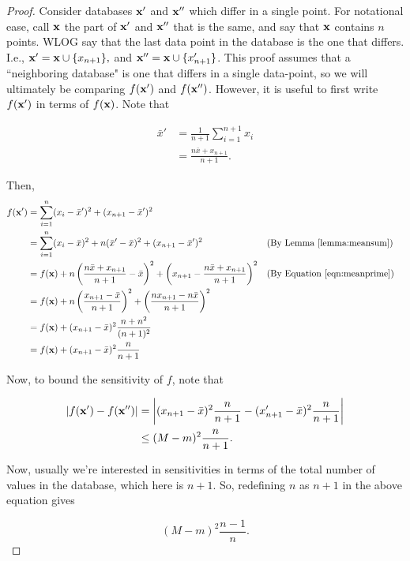 \documentclass[11pt]{scrartcl} %
\begin{document}
\begin{proof}
Consider databases $\textbf{x}'$ and $\textbf{x}''$ which differ in a single point. For notational ease, call $\textbf{x}$ the part of $\textbf{x}'$ and $\textbf{x}''$
that is the same, and say that $\textbf{x}$ contains $n$ points. WLOG say that the last data point in the database is the one that differs. I.e.,  
$\textbf{x}' = \textbf{x} \cup \{x_{n+1}\},$ and $\textbf{x}'' = \textbf{x} \cup \{x'_{n+1}\}$. This proof assumes that a ``neighboring database" is one that differs in a single
data-point, so we will ultimately be comparing $f(\textbf{x}')$ and $f(\textbf{x}'')$. However, it is useful to first write $f(\textbf{x}')$ in terms of $f(\textbf{x})$.
Note that

\begin{align}
\label{eqn:meanprime}
\bar{x}' &= \frac{1}{n+1} \sum_{i=1}^{n+1} x_i \nonumber \\
	&= \frac{n\bar{x} + x_{n+1}}{n+1}.
\end{align}

Then,
\begin{align*}
f(\textbf{x}') &= \sum_{i=1}^n (x_i - \bar{x}')^2 + (x_{n+1} - \bar{x}')^2\\
	&= \sum_{i=1}^n (x_i - \bar{x})^2 + n(\bar{x}'-\bar{x})^2 + (x_{n+1} - \bar{x}')^2 &&\text{(By Lemma \ref{lemma:meansum})}\\
	&= f(\textbf{x}) + n\left( \frac{n\bar{x} + x_{n+1}}{n+1}-\bar{x}\right)^2 + \left(x_{n+1} - \frac{n\bar{x} + x_{n+1}}{n+1} \right)^2 &&\text{(By Equation \ref{eqn:meanprime})}\\
	&= f(\textbf{x}) + n\left(\frac{x_{n+1}-\bar{x}}{n+1}\right)^2 + \left( \frac{nx_{n+1}-n\bar{x}}{n+1}\right)^2\\
	&= f(\textbf{x}) + (x_{n+1}-\bar{x})^2 \frac{n+n^2}{(n+1)^2}\\
	&= f(\textbf{x}) + (x_{n+1}-\bar{x})^2 \frac{n}{n+1}\\
\end{align*}

Now, to bound the sensitivity of $f$, note that

\begin{align*}
\left\vert f(\textbf{x}') - f(\textbf{x}'') \right\vert &= \left\vert (x_{n+1}-\bar{x})^2 \frac{n}{n+1} - (x_{n+1}'-\bar{x})^2 \frac{n}{n+1} \right\vert\\
	&\le (M-m)^2 \frac{n}{n+1}.
\end{align*}

Now, usually we're interested in sensitivities in terms of the total number of values in the database, which here is $n+1$. So, redefining $n$ as $n+1$ in the above equation gives

$$ (M-m)^2 \frac{n-1}{n}.$$
\end{proof}
\end{document}
